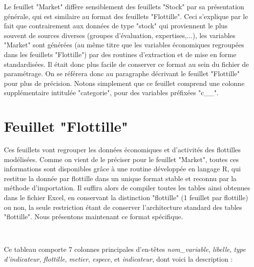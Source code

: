 \documentclass[12pt, colorinlistoftodos]{article}
\newenvironment{not used}[1]{%
    \longtable{%
        |>{\centering$\displaystyle}A{#1}{1}<{$}%
        |}\hline\ignorespaces}{%
    \endlongtable\ignorespacesafterend}
\begin{document}
Le feuillet "Market" diffère sensiblement des feuillets "Stock" par sa présentation générale, qui est similaire au format des feuillets "Flottille". Ceci s'explique par le fait que contrairement aux données de type "stock" qui proviennent le plus souvent de sources diverses (groupes d'évaluation,  expertises,...), les variables "Market" sont générées (au même titre que les variables économiques regroupées dans les feuillets "Flottille") par des routines d'extraction et de mise en forme standardisées. Il était donc plus facile de conserver ce format au sein du fichier de paramétrage. On se référera  donc au paragraphe décrivant le feuillet "Flottille" pour plus de précision. Notons simplement que ce feuillet comprend une colonne supplémentaire intitulée "categorie", pour des variables préfixées "c\_\_".

  
\section{Feuillet "Flottille"}

Ces feuillets vont regrouper les données économiques et d'activités des flottilles modélisées. Comme on vient de le préciser pour le feuillet "Market", toutes ces informations sont disponibles grâce à une routine développée en langage R, qui restitue  la donnée par flottille dans un unique format stable et reconnu par la méthode d'importation. Il suffira alors de compiler toutes les tables ainsi obtenues dans le fichier Excel,  en conservant la distinction "flottille" (1 feuillet par flottille) ou non, la seule restriction étant de conserver l'architecture standard des tables "flottille". Nous présentons maintenant ce format spécifique.

\par~\par

Ce tableau comporte 7 colonnes principales d'en-têtes \textit{nom\_variable}, \textit{libelle}, \textit{type d'indicateur}, \textit{flottille}, \textit{metier}, \textit{espece}, et \textit{indicateur}, dont voici la description :
\end{document}
